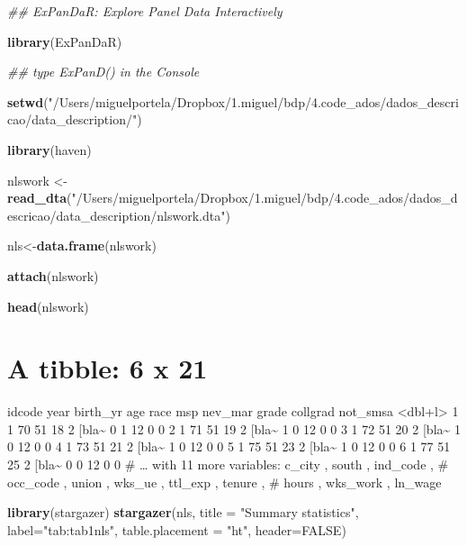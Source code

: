 \documentclass[
  12pt,
]{article}
\newenvironment{Shaded}{\begin{snugshade}}{\end{snugshade}}
\newcommand{\CommentTok}[1]{\textcolor[rgb]{0.56,0.35,0.01}{\textit{#1}}}
\newcommand{\DataTypeTok}[1]{\textcolor[rgb]{0.13,0.29,0.53}{#1}}
\newcommand{\KeywordTok}[1]{\textcolor[rgb]{0.13,0.29,0.53}{\textbf{#1}}}
\newcommand{\NormalTok}[1]{#1}
\newcommand{\OtherTok}[1]{\textcolor[rgb]{0.56,0.35,0.01}{#1}}
\newcommand{\StringTok}[1]{\textcolor[rgb]{0.31,0.60,0.02}{#1}}
\begin{document}
\begin{Shaded}
\begin{Highlighting}[]
\CommentTok{## ExPanDaR: Explore Panel Data Interactively}

  \KeywordTok{library}\NormalTok{(ExPanDaR)}
    
    \CommentTok{## type ExPanD() in the Console}

\KeywordTok{setwd}\NormalTok{(}\StringTok{"/Users/miguelportela/Dropbox/1.miguel/bdp/4.code_ados/dados_descricao/data_description/"}\NormalTok{)}

\KeywordTok{library}\NormalTok{(haven)}

\NormalTok{nlswork <-}\StringTok{ }\KeywordTok{read_dta}\NormalTok{(}\StringTok{"/Users/miguelportela/Dropbox/1.miguel/bdp/4.code_ados/dados_descricao/data_description/nlswork.dta"}\NormalTok{)}

\NormalTok{nls<-}\KeywordTok{data.frame}\NormalTok{(nlswork)}

\KeywordTok{attach}\NormalTok{(nlswork)}

\KeywordTok{head}\NormalTok{(nlswork)}
\end{Highlighting}
\end{Shaded}

\hypertarget{a-tibble-6-x-21}{%
\section{A tibble: 6 x 21}\label{a-tibble-6-x-21}}

idcode year birth\_yr age race msp nev\_mar grade collgrad not\_smsa
\textless dbl+l\textgreater{}
1 1 70 51 18 2 {[}bla\textasciitilde{} 0 1 12 0 0
2 1 71 51 19 2 {[}bla\textasciitilde{} 1 0 12 0 0
3 1 72 51 20 2 {[}bla\textasciitilde{} 1 0 12 0 0
4 1 73 51 21 2 {[}bla\textasciitilde{} 1 0 12 0 0
5 1 75 51 23 2 {[}bla\textasciitilde{} 1 0 12 0 0
6 1 77 51 25 2 {[}bla\textasciitilde{} 0 0 12 0 0
\# \ldots{} with 11 more variables: c\_city , south , ind\_code ,
\# occ\_code , union , wks\_ue , ttl\_exp , tenure ,
\# hours , wks\_work , ln\_wage

\begin{Shaded}
\begin{Highlighting}[]
\KeywordTok{library}\NormalTok{(stargazer)}
\KeywordTok{stargazer}\NormalTok{(nls, }
          \DataTypeTok{title =} \StringTok{"Summary statistics"}\NormalTok{,}
          \DataTypeTok{label=}\StringTok{"tab:tab1nls"}\NormalTok{, }
          \DataTypeTok{table.placement =} \StringTok{"ht"}\NormalTok{, }
          \DataTypeTok{header=}\OtherTok{FALSE}\NormalTok{)}
\end{Highlighting}
\end{Shaded}
\end{document}

